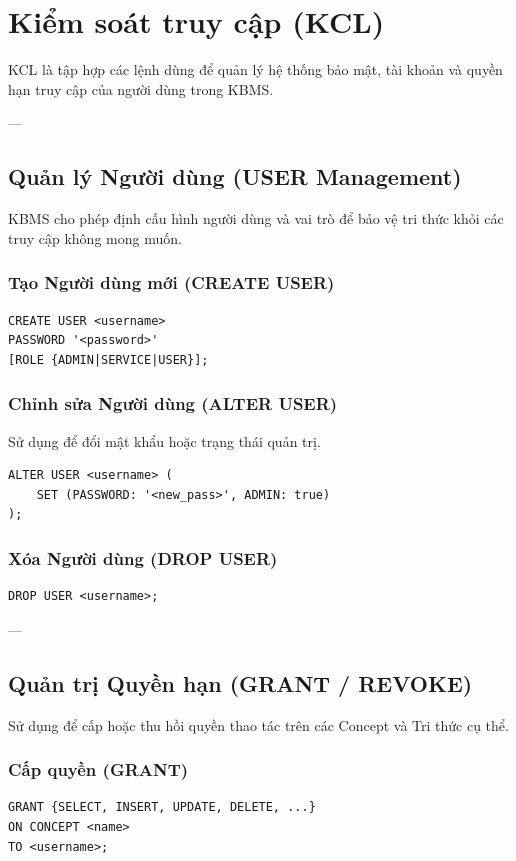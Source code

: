 \section{Kiểm soát truy cập (KCL)}

KCL là tập hợp các lệnh dùng để quản lý hệ thống bảo mật, tài khoản và quyền hạn truy cập của người dùng trong KBMS.

---

\subsection{Quản lý Người dùng (USER Management)}

KBMS cho phép định cấu hình người dùng và vai trò để bảo vệ tri thức khỏi các truy cập không mong muốn.

\subsubsection{Tạo Người dùng mới (CREATE USER)}
\begin{verbatim}
CREATE USER <username> 
PASSWORD '<password>' 
[ROLE {ADMIN|SERVICE|USER}];
\end{verbatim}

\subsubsection{Chỉnh sửa Người dùng (ALTER USER)}
Sử dụng để đổi mật khẩu hoặc trạng thái quản trị.
\begin{verbatim}
ALTER USER <username> (
    SET (PASSWORD: '<new_pass>', ADMIN: true)
);
\end{verbatim}

\subsubsection{Xóa Người dùng (DROP USER)}
\begin{verbatim}
DROP USER <username>;
\end{verbatim}

---

\subsection{Quản trị Quyền hạn (GRANT / REVOKE)}

Sử dụng để cấp hoặc thu hồi quyền thao tác trên các Concept và Tri thức cụ thể.

\subsubsection{Cấp quyền (GRANT)}
\begin{verbatim}
GRANT {SELECT, INSERT, UPDATE, DELETE, ...} 
ON CONCEPT <name> 
TO <username>;
\end{verbatim}

